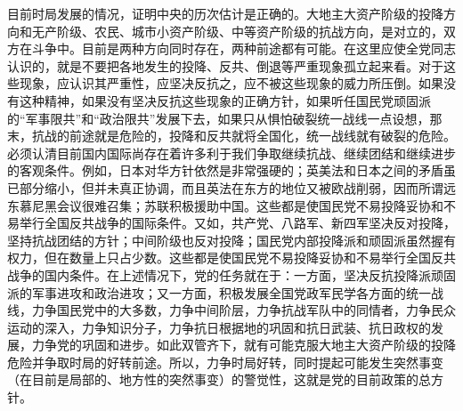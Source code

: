 \documentclass[cn,11pt,chinese]{elegantbook}
\begin{document}
目前时局发展的情况，证明中央的历次估计是正确的。大地主大资产阶级的投降方向和无产阶级、农民、城市小资产阶级、中等资产阶级的抗战方向，是对立的，双方在斗争中。目前是两种方向同时存在，两种前途都有可能。在这里应使全党同志认识的，就是不要把各地发生的投降、反共、倒退等严重现象孤立起来看。对于这些现象，应认识其严重性，应坚决反抗之，应不被这些现象的威力所压倒。如果没有这种精神，如果没有坚决反抗这些现象的正确方针，如果听任国民党顽固派的“军事限共”和“政治限共”发展下去，如果只从惧怕破裂统一战线一点设想，那末，抗战的前途就是危险的，投降和反共就将全国化，统一战线就有破裂的危险。必须认清目前国内国际尚存在着许多利于我们争取继续抗战、继续团结和继续进步的客观条件。例如，日本对华方针依然是非常强硬的；英美法和日本之间的矛盾虽已部分缩小，但并未真正协调，而且英法在东方的地位又被欧战削弱，因而所谓远东慕尼黑会议很难召集；苏联积极援助中国。这些都是使国民党不易投降妥协和不易举行全国反共战争的国际条件。又如，共产党、八路军、新四军坚决反对投降，坚持抗战团结的方针；中间阶级也反对投降；国民党内部投降派和顽固派虽然握有权力，但在数量上只占少数。这些都是使国民党不易投降妥协和不易举行全国反共战争的国内条件。在上述情况下，党的任务就在于：一方面，坚决反抗投降派顽固派的军事进攻和政治进攻；又一方面，积极发展全国党政军民学各方面的统一战线，力争国民党中的大多数，力争中间阶层，力争抗战军队中的同情者，力争民众运动的深入，力争知识分子，力争抗日根据地的巩固和抗日武装、抗日政权的发展，力争党的巩固和进步。如此双管齐下，就有可能克服大地主大资产阶级的投降危险并争取时局的好转前途。所以，力争时局好转，同时提起可能发生突然事变（在目前是局部的、地方性的突然事变）的警觉性，这就是党的目前政策的总方针。\\
\end{document}
